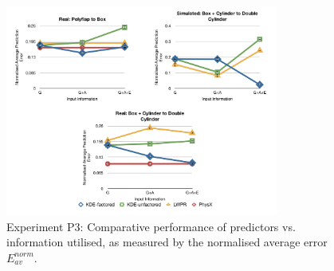 \begin{figure}[t]
\centerline{\includegraphics[width=0.8\textwidth]{./P3-graphs}}
\caption{Experiment P3: Comparative performance of predictors vs. information utilised, as measured by the normalised average error ${E_{av}^{norm}}$. 
}\label{fig:S_av_graphs}
\end{figure}
\newlength{\imgCXwid}
\setlength{\imgCXwid}{2.2cm}

